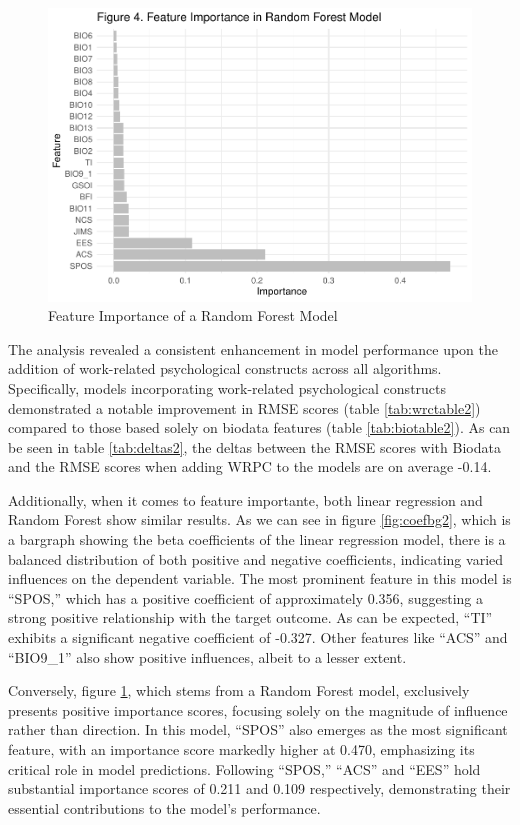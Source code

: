 \documentclass[
  man]{apa7}
\begin{document}
\begin{figure}
\centering
\includegraphics{dissertation_files/figure-latex/featuresbg2-1.pdf}
\caption{\label{fig:featuresbg2}Feature Importance of a Random Forest Model}
\end{figure}

The analysis revealed a consistent enhancement in model performance upon the addition of work-related psychological constructs across all algorithms. Specifically, models incorporating work-related psychological constructs demonstrated a notable improvement in RMSE scores (table \ref{tab:wrctable2}) compared to those based solely on biodata features (table \ref{tab:biotable2}). As can be seen in table \ref{tab:deltas2}, the deltas between the RMSE scores with Biodata and the RMSE scores when adding WRPC to the models are on average -0.14.

Additionally, when it comes to feature importante, both linear regression and Random Forest show similar results. As we can see in figure \ref{fig:coefbg2}, which is a bargraph showing the beta coefficients of the linear regression model, there is a balanced distribution of both positive and negative coefficients, indicating varied influences on the dependent variable. The most prominent feature in this model is ``SPOS,'' which has a positive coefficient of approximately 0.356, suggesting a strong positive relationship with the target outcome. As can be expected, ``TI'' exhibits a significant negative coefficient of -0.327. Other features like ``ACS'' and ``BIO9\_1'' also show positive influences, albeit to a lesser extent.

Conversely, figure \ref{fig:featuresbg2}, which stems from a Random Forest model, exclusively presents positive importance scores, focusing solely on the magnitude of influence rather than direction. In this model, ``SPOS'' also emerges as the most significant feature, with an importance score markedly higher at 0.470, emphasizing its critical role in model predictions. Following ``SPOS,'' ``ACS'' and ``EES'' hold substantial importance scores of 0.211 and 0.109 respectively, demonstrating their essential contributions to the model's performance.
\end{document}
